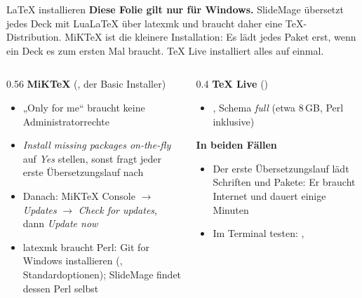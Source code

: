 

\begin{standardframe}{LaTeX installieren}
	\small
	\textbf{Diese Folie gilt nur für Windows.}
	SlideMage übersetzt jedes Deck mit LuaLaTeX über latexmk und braucht daher eine
	TeX-Distribution. MiKTeX ist die kleinere Installation: Es lädt jedes
	Paket erst, wenn ein Deck es zum ersten Mal braucht. TeX Live installiert alles auf einmal.
	\par\medskip
	\begin{columns}[T,onlytextwidth]
		\begin{column}{0.56\linewidth}
			\textbf{MiKTeX} (, der Basic Installer)
			\begin{itemize}
				\item „Only for me“ braucht keine Administratorrechte
				\item \emph{Install missing packages on-the-fly} auf \emph{Yes} stellen, sonst fragt jeder erste Übersetzungslauf nach
				\item Danach: MiKTeX Console $\rightarrow$ \emph{Updates} $\rightarrow$ \emph{Check for updates}, dann \emph{Update now}
				\item latexmk braucht Perl: Git for Windows installieren (, Standardoptionen); SlideMage findet dessen Perl selbst
			\end{itemize}
		\end{column}
		\begin{column}{0.4\linewidth}
			\textbf{TeX Live} ()
			\begin{itemize}
				\item {}, Schema \emph{full} (etwa 8\,GB, Perl inklusive)
			\end{itemize}
			\medskip
			\textbf{In beiden Fällen}
			\begin{itemize}
				\item Der erste Übersetzungslauf lädt Schriften und Pakete: Er braucht Internet und dauert einige Minuten
				\item Im Terminal testen: , 
			\end{itemize}
		\end{column}
	\end{columns}
\end{standardframe}
